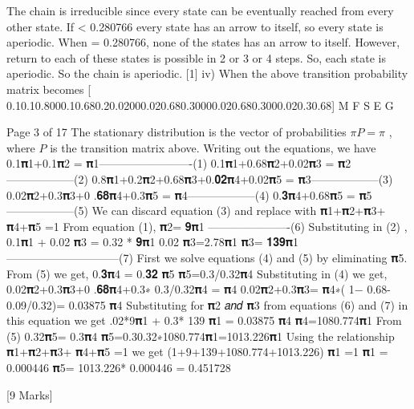 \item
The chain is irreducible since every state can be eventually reached from every other state.
If \alpha < 0.280766 every state has an arrow to itself, so every state is aperiodic.
When \alpha = 0.280766, none of the states has an arrow to itself. However, return to each of these states is possible in 2 or 3 or 4 steps. 
So, each state is aperiodic. So the chain is aperiodic.
[1]
iv)
When  the above transition probability matrix becomes
[ 0.10.10.8000.10.680.20.02000.020.680.30000.020.680.3000.020.30.68]
M
F
S
E
G

Page 3 of 17
The stationary distribution is the vector of probabilities $\pi P = \pi$ , where $P$ is the transition matrix above. 
Writing out the equations, we have
0.1𝛑1+0.1𝛑2 = 𝛑1-------------------------(1)
0.1𝛑1+0.68𝛑2+0.02𝛑3 = 𝛑2------------------(2)
0.8𝛑1+0.2𝛑2+0.68𝛑3+0.𝟎𝟐𝛑4+0.02𝛑5 = 𝛑3------------------(3)
0.02𝛑2+0.3𝛑3+0 .𝟔𝟖𝛑4+0.3𝛑5 = 𝛑4------------------(4)
0.𝟑𝛑4+0.68𝛑5 = 𝛑5------------------(5)
We can discard equation (3) and replace with
𝛑1+𝛑2+𝛑3+ 𝛑4+𝛑5 =1
From equation (1), 𝛑2= 𝟗𝛑1 ----------------------(6)
Substituting in (2) ,
0.1𝛑1 + 0.02 𝛑3 = 0.32 * 𝟗𝛑1
0.02 𝛑3=2.78𝛑1
𝛑3= 𝟏𝟑𝟗𝛑1 ------------------------------(7)
First we solve equations (4) and (5) by eliminating 𝛑5.
From (5) we get, 0.𝟑𝛑4 = 0.𝟑𝟐 𝛑5
𝛑5=0.3/0.32𝛑4
Substituting in (4) we get,
0.02𝛑2+0.3𝛑3+0 .𝟔𝟖𝛑4+0.3∗ 0.3/0.32𝛑4 = 𝛑4
0.02𝛑2+0.3𝛑3= 𝛑4∗( 1− 0.68- 0.09/0.32)= 0.03875 𝛑4
Substituting for 𝛑2 𝑎𝑛𝑑 𝛑3 from equations (6) and (7) in this equation we get
.02*9𝛑1 + 0.3* 139 𝛑1 = 0.03875 𝛑4
𝛑4=1080.774𝛑1
From (5) 0.32𝛑5= 0.3𝛑4 𝛑5=0.30.32∗1080.774𝛑1=1013.226𝛑1
Using the relationship 𝛑1+𝛑2+𝛑3+ 𝛑4+𝛑5 =1 we get
(1+9+139+1080.774+1013.226) 𝛑1 =1
𝛑1 = 0.000446
𝛑5= 1013.226* 0.000446 = 0.451728

[9 Marks]

